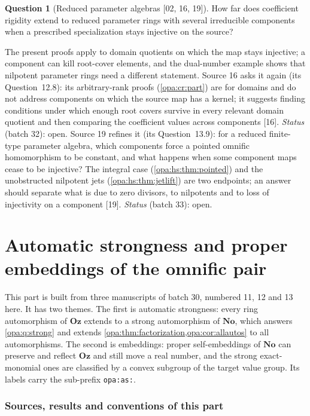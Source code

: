 \documentclass[11pt,oneside]{article}
\numberwithin{equation}{section}
\theoremstyle{definition}
\newtheorem{question}[question]{Question}
\theoremstyle{remark}
\newcommand{\No}{\mathbf{No}}
\newcommand{\Oz}{\mathbf{Oz}}
\newcommand{\src}[1]{\textup{\textsf{\small[#1]}}}
\newcommand{\lbl}[1]{\nolinkurl{#1}}
\begin{document}
\begin{question}[Reduced parameter algebras \src{02, 16, 19}]\label{opa:par:q:reduced}
How far does coefficient rigidity extend to reduced parameter rings with several
irreducible components when a prescribed specialization stays injective on the source?
\end{question}
The present proofs apply to domain quotients on which the map stays injective; a
component can kill root-cover elements, and the dual-number example shows that
nilpotent parameter rings need a different statement. Source 16 asks it again (its
Question~12.8): its arbitrary-rank proofs (\cref{opa:cr:part}) are for domains and do not
address components on which the source map has a kernel; it suggests finding conditions
under which enough root covers survive in every relevant domain quotient and then
comparing the coefficient values across components \src{16}. \emph{Status} (batch 32):
open. Source 19 refines it (its Question~13.9): for a reduced finite-type parameter algebra,
which components force a pointed omnific homomorphism to be constant, and what happens when
some component maps cease to be injective? The integral case (\cref{opa:hs:thm:pointed}) and
the unobstructed nilpotent jets (\cref{opa:hs:thm:jetlift}) are two endpoints; an answer should
separate what is due to zero divisors, to nilpotents and to loss of injectivity on a component
\src{19}. \emph{Status} (batch 33): open.

\part{Automatic strongness and proper embeddings of the omnific pair}\label{opa:part:as}

This part is built from three manuscripts of batch 30, numbered 11, 12 and 13 here.
It has two themes. The first is automatic strongness: every ring automorphism of
$\Oz$ extends to a strong automorphism of $\No$, which answers
\cref{opa:q:strong} and extends \cref{opa:thm:factorization,opa:cor:allautos} to
all automorphisms. The second is embeddings: proper self-embeddings of $\No$ can
preserve and reflect $\Oz$ and still move a real number, and the strong
exact-monomial ones are classified by a convex subgroup of the target value group.
Its labels carry the sub-prefix \lbl{opa:as:}.

\section{Sources, results and conventions of this part}\label{opa:as:sec:intro}
\end{document}
